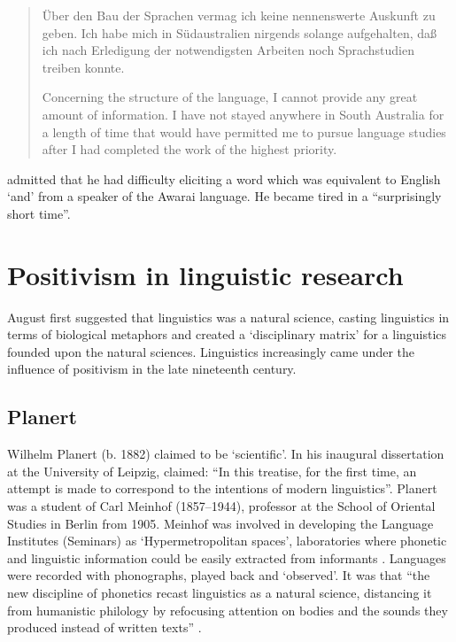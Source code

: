 \documentclass[output=paper]{../langscibook}
\begin{document}
\begin{quote}
    Über den Bau der Sprachen vermag ich keine nennenswerte Auskunft zu geben. Ich habe mich in Südaustralien nirgends solange aufgehalten, daß ich nach Erledigung der notwendigsten Arbeiten noch Sprachstudien treiben konnte. 

    Concerning the structure of the language, I cannot provide any great amount of information. I have not stayed anywhere in South Australia for a length of time that would have permitted me to pursue language studies after I had completed the work of the highest priority. \citep[81]{eylmann_eingeborenen_1908}
\end{quote}

\citet[81]{eylmann_eingeborenen_1908} admitted that he had difficulty eliciting a word which was equivalent to English ‘and’ from a speaker of the Awarai language. He became tired in a ``surprisingly short time''.

\section{Positivism in linguistic research}

August \citet{schleicher_sprachen_1983}  first suggested that linguistics was a natural science, casting linguistics in terms of biological metaphors and created a ‘disciplinary matrix’ for a linguistics founded upon the natural sciences. Linguistics increasingly came under the influence of positivism in the late nineteenth century.

\subsection{Planert}

Wilhelm Planert (b. 1882) claimed to be ‘scientific’. In his inaugural dissertation at the University of Leipzig, \citet{planert_syntaktischen_1907} claimed: “In this treatise, for the first time, an attempt is made to correspond to the intentions of modern linguistics”. Planert was a student of Carl Meinhof (1857--1944), professor at the School of Oriental Studies in Berlin from 1905. Meinhof was involved in developing the Language Institutes (Seminars) as ‘Hypermetropolitan spaces’, laboratories where phonetic and linguistic information could be easily extracted from informants \citep[138]{pugach_africa_2012}. Languages were recorded with phonographs, played back and ‘observed’. It was that “the new discipline of phonetics recast linguistics as a natural science, distancing it from humanistic philology by refocusing attention on bodies and the sounds they produced instead of written texts” \citep[93]{pugach_africa_2012}. 
\end{document}
